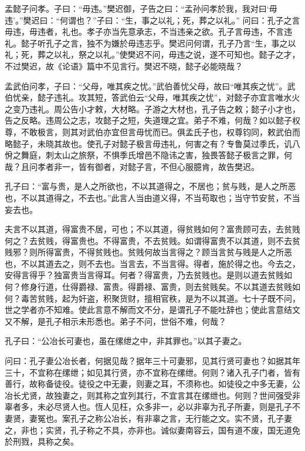 \documentclass[]{article}
\begin{document}
孟懿子问孝。子曰：``毋违。''樊迟御，子告之曰：``孟孙问孝於我，我对曰`毋违'。''樊迟曰：``何谓也？''子曰：``生，事之以礼；死，葬之以礼。''
问曰：孔子之言毋违，毋违者，礼也。孝子亦当先意承志，不当违亲之欲。孔子言毋违，不言违礼。懿子听孔子之言，独不为嫌於毋违志乎。樊迟问何谓，孔子乃言``生，事之以礼；死，葬之以礼，祭之以礼。''使樊迟不问，毋违之说，遂不可知也。懿子之才，不过樊迟，故《论语》篇中不见言行。樊迟不晓，懿子必能晓哉？

孟武伯问孝，子曰：``父母，唯其疾之忧。''武伯善忧父母，故曰``唯其疾之忧''。武伯忧亲，懿子违礼。攻其短，答武伯云``父母，唯其疾之忧''，对懿子亦宜言唯水火之变乃违礼。周公告小才敕，大材略。子游之大材也，孔子告之敕；懿子小才也，告之反略。违周公之志，攻懿子之短，失道理之宜。弟子不难，何哉？如以懿子权尊，不敢极言，则其对武伯亦宜但言毋忧而已。俱孟氏子也，权尊钧同，敕武伯而略懿子，未晓其故也。使孔子对懿子极言毋违礼，何害之有？专鲁莫过季氏，讥八佾之舞庭，刺太山之旅祭，不惧季氏增邑不隐讳之害，独畏答懿子极言之罪，何哉？且问孝者非一，皆有御者，对懿子言，不但心服臆肯，故告樊迟。

孔子曰：``富与贵，是人之所欲也，不以其道得之，不居也；贫与贱，是人之所恶也，不以其道得之，不去也。''此言人当由道义得，不当苟取也；当守节安贫，不当妄去也。

夫言不以其道，得富贵不居，可也；不以其道，得贫贱如何？富贵顾可去，去贫贱何之？去贫贱，得富贵也。不得富贵，不去贫贱。如谓得富贵不以其道，则不去贫贱邪？则所得富贵，不得贫贱也。贫贱何故当言得之？顾当言贫与贱是人之所恶也，不以其道去之，则不去也。当言去，不当言得。得者，施於得之也。今去之，安得言得乎？独富贵当言得耳。何者？得富贵，乃去贫贱也。是则以道去贫贱如何？修身行道，仕得爵禄、富贵。得爵禄、富贵，则去贫贱矣。不以其道去贫贱如何？毒苦贫贱，起为奸盗，积聚货财，擅相官秩，是为不以其道。七十子既不问，世之学者亦不知难。使此言意不解而文不分，是谓孔子不能吐辞也；使此言意结文又不解，是孔子相示未形悉也。弟子不问，世俗不难，何哉？

孔子曰：``公冶长可妻也，虽在缧绁之中，非其罪也。''以其子妻之。

问曰：孔子妻公冶长者，何据见哉？据年三十可妻邪，见其行贤可妻也？如据其年三十，不宜称在缧绁；如见其行贤，亦不宜称在缧绁。何则？诸入孔子门者，皆有善行，故称备徒役。徒役之中无妻，则妻之耳，不须称也。如徒役之中多无妻，公冶长尤贤，故独妻之，则其称之宜列其行，不宜言其在缧绁也。何则？世间强受非辜者多，未必尽贤人也。恆人见枉，众多非一，必以非辜为孔子所妻，则是孔子不妻贤，妻冤也。案孔子之称公冶长，有非辜之言，无行能之文。实不贤，孔子妻之，非也；实贤，孔子称之不具，亦非也。诚似妻南容云，国有道不废，国无道免於刑戮，具称之矣。
\end{document}
